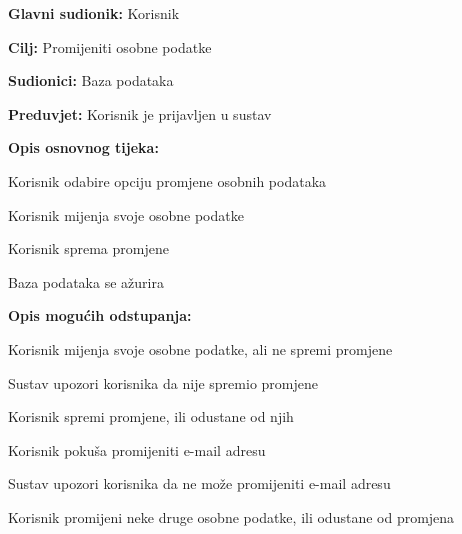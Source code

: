 					\noindent {}
					\begin{packed_item}
	
						\item \textbf{Glavni sudionik: }Korisnik
						\item  \textbf{Cilj:} Promijeniti osobne podatke
						\item  \textbf{Sudionici:} Baza podataka
						\item  \textbf{Preduvjet:} Korisnik je prijavljen u sustav
						\item  \textbf{Opis osnovnog tijeka:}
						
						\item[] \begin{packed_enum}
	
							\item Korisnik odabire opciju promjene osobnih podataka
							\item Korisnik mijenja svoje osobne podatke
							\item Korisnik sprema promjene
							\item Baza podataka se ažurira
						\end{packed_enum}
						
						\item  \textbf{Opis mogućih odstupanja:}
						
						\item[] \begin{packed_item}
	
							\item[2.a] Korisnik mijenja svoje osobne podatke, ali ne spremi promjene
							\item[] \begin{packed_enum}
								
								\item Sustav upozori korisnika da nije spremio promjene
								\item Korisnik spremi promjene, ili odustane od njih
								
							\end{packed_enum}
							
							\item[2.b] Korisnik pokuša promijeniti e-mail adresu
							\item[] \begin{packed_enum}
								
								\item Sustav upozori korisnika da ne može promijeniti e-mail adresu
								\item Korisnik promijeni neke druge osobne podatke, ili odustane od promjena
								

\end{packed_enum}
\end{packed_item}
\end{packed_item}
